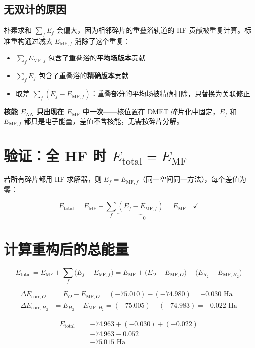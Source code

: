 \documentclass[11pt,a4paper]{article}
\begin{document}
\subsection{无双计的原因}

朴素求和 $\sum_f E_f$ 会偏大，因为相邻碎片的重叠浴轨道的 HF 贡献被重复计算。标准重构通过减去 $E_{\text{MF},f}$ 消除了这个重复：

\begin{itemize}
  \item $\sum_f E_{\text{MF},f}$ 包含了重叠浴的\textbf{平均场版本}贡献
  \item $\sum_f E_f$ 包含了重叠浴的\textbf{精确版本}贡献
  \item 取差 $\sum_f (E_f - E_{\text{MF},f})$：重叠部分的平均场被精确扣除，只替换为关联修正
\end{itemize}

\textbf{核能 $E_{NN}$ 只出现在 $E_{\text{MF}}$ 中一次}——核位置在 DMET 碎片化中固定，$E_f$ 和 $E_{\text{MF},f}$ 都只是电子能量，差值不含核能，无需按碎片分解。


\section{验证：全 HF 时 $E_{\text{total}} = E_{\text{MF}}$}

若所有碎片都用 HF 求解器，则 $E_f = E_{\text{MF},f}$（同一空间同一方法），每个差值为零：

\begin{equation}
  E_{\text{total}} = E_{\text{MF}} + \sum_f \underbrace{(E_f - E_{\text{MF},f})}_{=\,0} = E_{\text{MF}} \quad \checkmark
\end{equation}

\section{计算重构后的总能量}

\begin{equation}
  E_{\text{total}} = E_{\text{MF}} + \sum_f \big(E_f - E_{\text{MF},f}\big) = E_{\text{MF}} + \big(E_O - E_{\text{MF},O}\big) + \big(E_{H_2} - E_{\text{MF},H_2}\big)
\end{equation}

\begin{align}
  \Delta E_{\text{corr},O} &= E_O - E_{\text{MF},O} = (-75.010) - (-74.980) = -0.030 \text{ Ha} \\
  \Delta E_{\text{corr},H_2} &= E_{H_2} - E_{\text{MF},H_2} = (-75.005) - (-74.983) = -0.022 \text{ Ha}
\end{align}

\begin{align}
  E_{\text{total}} &= -74.963 + (-0.030) + (-0.022) \\
  &= -74.963 - 0.052 \\
  &= \boxed{-75.015 \text{ Ha}}
\end{align}
\end{document}
